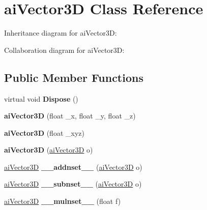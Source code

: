 \hypertarget{structai_vector3_d}{\section{ai\+Vector3\+D Class Reference}
\label{structai_vector3_d}
}


Inheritance diagram for ai\+Vector3\+D\+:


Collaboration diagram for ai\+Vector3\+D\+:
\subsection*{Public Member Functions}
\begin{DoxyCompactItemize}
\item 
\hypertarget{structai_vector3_d_a933937603f5feec9833e03d5ee2441da}{virtual void {\bfseries Dispose} ()}\label{structai_vector3_d_a933937603f5feec9833e03d5ee2441da}

\item 
\hypertarget{structai_vector3_d_a8f2a9898dfd92261204c2a7ccb4e89d4}{{\bfseries ai\+Vector3\+D} (float \+\_\+x, float \+\_\+y, float \+\_\+z)}\label{structai_vector3_d_a8f2a9898dfd92261204c2a7ccb4e89d4}

\item 
\hypertarget{structai_vector3_d_a8cee4f7086ce5939cd81bd13f19db955}{{\bfseries ai\+Vector3\+D} (float \+\_\+xyz)}\label{structai_vector3_d_a8cee4f7086ce5939cd81bd13f19db955}

\item 
\hypertarget{structai_vector3_d_abcae63914452509ace18c2c8681b0717}{{\bfseries ai\+Vector3\+D} (\hyperlink{structai_vector3_d}{ai\+Vector3\+D} o)}\label{structai_vector3_d_abcae63914452509ace18c2c8681b0717}

\item 
\hypertarget{structai_vector3_d_af6fd27b45f5c948cef4d8ea37aac8644}{\hyperlink{structai_vector3_d}{ai\+Vector3\+D} {\bfseries \+\_\+\+\_\+addnset\+\_\+\+\_\+} (\hyperlink{structai_vector3_d}{ai\+Vector3\+D} o)}\label{structai_vector3_d_af6fd27b45f5c948cef4d8ea37aac8644}

\item 
\hypertarget{structai_vector3_d_aeac312dc87f7a8cc2bdc72f2abae9b56}{\hyperlink{structai_vector3_d}{ai\+Vector3\+D} {\bfseries \+\_\+\+\_\+subnset\+\_\+\+\_\+} (\hyperlink{structai_vector3_d}{ai\+Vector3\+D} o)}\label{structai_vector3_d_aeac312dc87f7a8cc2bdc72f2abae9b56}

\item 
\hypertarget{structai_vector3_d_a9472d6200bc30d985a5381cb0b140b7f}{\hyperlink{structai_vector3_d}{ai\+Vector3\+D} {\bfseries \+\_\+\+\_\+mulnset\+\_\+\+\_\+} (float f)}\label{structai_vector3_d_a9472d6200bc30d985a5381cb0b140b7f}


\end{DoxyCompactItemize}
